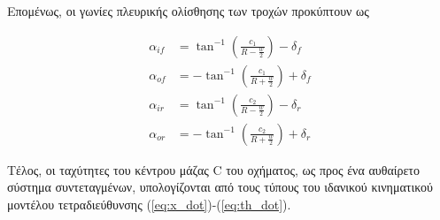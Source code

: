 Επομένως, οι γωνίες πλευρικής ολίσθησης των τροχών προκύπτουν ως

\begin{align}
	\alpha_{if} &= \tan^{-1}(\frac{c_1}{R-\frac{w}{2}}) - \delta_f
	\label{eq:monst_aif}\\
	\alpha_{of} &= -\tan^{-1}(\frac{c_1}{R+\frac{w}{2}}) + \delta_f
	\label{eq:monst_aof}\\
	\alpha_{ir} &= \tan^{-1}(\frac{c_2}{R-\frac{w}{2}}) - \delta_r
	\label{eq:monst_air}\\
	\alpha_{or} &= -\tan^{-1}(\frac{c_2}{R+\frac{w}{2}}) + \delta_r
	\label{eq:monst_aor}	
\end{align}


Τέλος, οι ταχύτητες του κέντρου μάζας C του οχήματος, ως προς ένα αυθαίρετο σύστημα συντεταγμένων, υπολογίζονται από τους τύπους του ιδανικού κινηματικού μοντέλου τετραδιεύθυνσης (\ref{eq:x_dot})-(\ref{eq:th_dot}).

